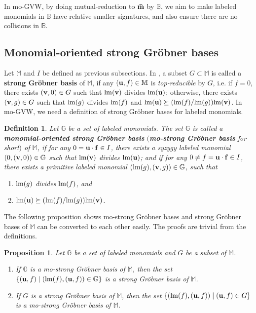 \documentclass[final, number, 3p,12pt]{elsarticle}
\newtheorem{prop}[theorem]{Proposition}
\newtheorem{define}[theorem]{Definition}
\def\B{{\mathbb{B}}}
\def\G{{\mathbb{G}}}
\def\M{{\mathbb M}}
\def\brm{{\bf \bar{m}}}
\def\lm{{\rm lm}} %
\def\f{{\bf f}}
\def\u{{\bf u}}
\def\v{{\bf v}}
\begin{document}
In mo-GVW, by doing mutual-reduction to $\brm$ by $\B$, we aim to make labeled monomials in $\B$ have relative smaller signatures, and also ensure there are no collisions in $\B$.





\subsection{Monomial-oriented strong Gr\"obner bases} \label{subsec_mosgb}

Let $\M$ and $I$ be defined as previous subsections. In \citep{Gao10b}, a subset $G\subset \M$ is called a {\bf strong Gr\"obner basis} of $\M$, if any $(\u, f) \in \M$ is {\em top-reducible} by $G$, i.e. if $f=0$, there exists $(\v, 0)\in G$ such that $\lm(\v)$ divides $\lm(\u)$; otherwise, there exists $(\v, g)\in G$ such that $\lm(g)$ divides $\lm(f)$ and $\lm(\u) \succeq (\lm(f)/\lm(g)) \lm(\v)$. In mo-GVW, we need a definition of strong Gr\"obner bases for labeled monomials.


\begin{define}%
Let $\G$ be a set of labeled monomials. The set $\G$ is called a {\bf monomial-oriented strong Gr\"obner basis} $(${\bf mo-strong Gr\"obner basis} for short$)$ of $\M$, if for any $0 = \u \cdot \f \in I$, there exists a syzygy labeled monomial $(0, (\v, 0)) \in \G$ such that $\lm(\v)$ divides $\lm(\u)$; and if for any $0\not= f = \u \cdot \f \in I$, there exists a primitive labeled monomial $(\lm(g), (\v, g)) \in \G$, such that 

\begin{enumerate}

\item $\lm(g)$ divides $\lm(f)$, and 

\item $\lm(\u) \succeq (\lm(f)/\lm(g))\lm(\v)$.

\end{enumerate}

\end{define}


The following proposition shows mo-strong Gr\"obner bases and strong Gr\"obner bases of $\M$ can be converted to each other easily. The proofs are trivial from the definitions.

\begin{prop} \label{prop_mosgb&sgb}
Let $\G$ be a set of labeled monomials and $G$ be a subset of $\M$.
\begin{enumerate}
\item If $\G$ is a mo-strong Gr\"obner basis of $\M$, then the set $\{(\u, f)\mid (\lm(f), (\u, f))\in \G\}$ is a strong Gr\"obner basis of $\M$.

\item If $G$ is a strong Gr\"obner basis of $\M$, then the set $\{(\lm(f),  (\u, f)) \mid (\u, f)\in G\}$ is a mo-strong Gr\"obner basis of $\M$.

\end{enumerate}
\end{prop}
\end{document}
